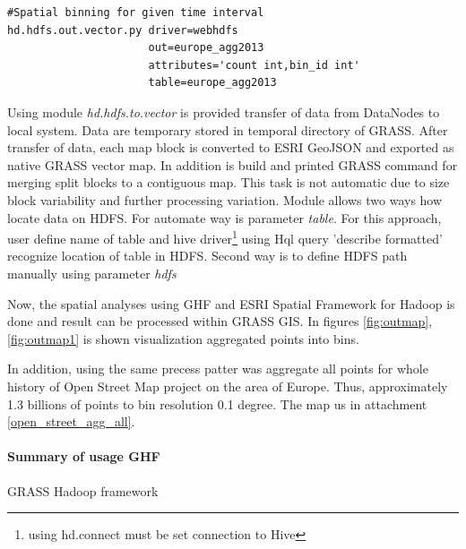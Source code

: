\documentclass[a4paper,12pt,oneside]{report}
\begin{document}
\begin{footnotesize}
	\begin{lstlisting}[style=python]
#Spatial binning for given time interval
hd.hdfs.out.vector.py driver=webhdfs
                      out=europe_agg2013 
                      attributes='count int,bin_id int' 
                      table=europe_agg2013
	\end{lstlisting}
\end{footnotesize}
	Using module \textit{hd.hdfs.to.vector} is provided transfer of data from DataNodes to local system. Data are temporary stored in temporal directory of GRASS. After transfer of data, each 
	map block is converted to ESRI GeoJSON and exported as native GRASS vector map. In addition is build and printed GRASS command for merging split blocks to a contiguous map. This task is not automatic due to size block variability  and further processing variation. Module allows two
	 ways how locate data on HDFS. For automate way is parameter \textit{table}. For this approach, user
	 define name of table and hive driver\footnote{using hd.connect must be set connection to Hive} using Hql query 'describe formatted' recognize location of table in HDFS.
	 Second way is to define HDFS path manually using parameter \textit{hdfs}
	
	Now, the spatial analyses using GHF and ESRI Spatial Framework for Hadoop is done and result can be processed within GRASS GIS. In figures \ref{fig:outmap}, \ref{fig:outmap1} is shown visualization aggregated points into bins.
	
	 In addition, using the same precess patter was aggregate all points for whole history of Open Street Map project on the area of Europe. Thus, approximately 1.3 billions  of points  to bin  resolution 0.1 degree. The map us in attachment \ref{open_street_agg_all}. 
	
	
	
	\paragraph{Summary of usage GHF}
	GRASS Hadoop framework
		
		
		
\end{document}
